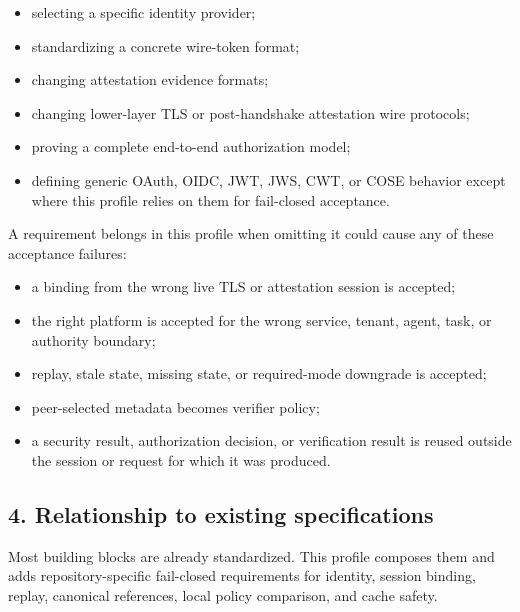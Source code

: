 \documentclass[
]{article}
\providecommand{\tightlist}{%
  \setlength{\itemsep}{0pt}\setlength{\parskip}{0pt}}
\begin{document}
\begin{itemize}
\tightlist
\item
  selecting a specific identity provider;
\item
  standardizing a concrete wire-token format;
\item
  changing attestation evidence formats;
\item
  changing lower-layer TLS or post-handshake attestation wire protocols;
\item
  proving a complete end-to-end authorization model;
\item
  defining generic OAuth, OIDC, JWT, JWS, CWT, or COSE behavior except
  where this profile relies on them for fail-closed acceptance.
\end{itemize}

A requirement belongs in this profile when omitting it could cause any
of these acceptance failures:

\begin{itemize}
\tightlist
\item
  a binding from the wrong live TLS or attestation session is accepted;
\item
  the right platform is accepted for the wrong service, tenant, agent,
  task, or authority boundary;
\item
  replay, stale state, missing state, or required-mode downgrade is
  accepted;
\item
  peer-selected metadata becomes verifier policy;
\item
  a security result, authorization decision, or verification result is
  reused outside the session or request for which it was produced.
\end{itemize}

\subsection{4. Relationship to existing
specifications}\label{relationship-to-existing-specifications}

Most building blocks are already standardized. This profile composes
them and adds repository-specific fail-closed requirements for identity,
session binding, replay, canonical references, local policy comparison,
and cache safety.
\end{document}
